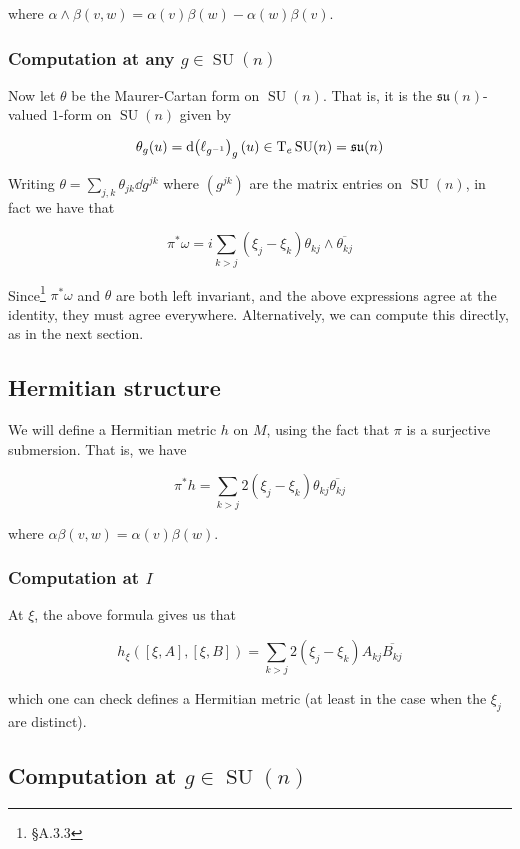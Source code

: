 \documentclass{article}
\DeclareMathOperator{\SU}{SU}
\newcommand{\su}{\mathfrak{su}}
\begin{document}
where \(\alpha \wedge \beta(v, w) = \alpha(v)\beta(w) - \alpha(w)\beta(v)\).

\subsubsection{Computation at any \(g \in \SU(n)\)}

Now let \(\theta\) be the Maurer-Cartan form on \(\SU(n)\). That is, it is the \(\su(n)\)-valued \(1\)-form on \(\SU(n)\) given by

\[\theta_g(u) = \dd (\ell_{g^{-1}})_g(u) \in \TT_e\SU(n) = \su(n)\]

Writing \(\theta = \sum_{j, k}\theta_{jk}\dd g^{jk}\) where \((g^{jk})\) are the matrix entries on \(\SU(n)\), in fact we have that

\[\pi^*\omega = i \sum_{k > j}(\xi_j - \xi_k)\theta_{kj}\wedge \overline{\theta_{kj}}\]

Since\footnote{\S A.3.3} \(\pi^*\omega\) and \(\theta\) are both left invariant, and the above expressions agree at the identity, they must agree everywhere. Alternatively, we can compute this directly, as in the next section.

\subsection{Hermitian structure}

We will define a Hermitian metric \(h\) on \( M\), using the fact that \(\pi\) is a surjective submersion. That is, we have

\[\pi^*h = \sum_{k > j}2(\xi_j - \xi_k)\theta_{kj}\overline{\theta_{kj}}\]

where \(\alpha\beta(v, w) = \alpha(v)\beta(w)\).

\subsubsection{Computation at \(I\)}

At \(\xi\), the above formula gives us that

\[h_\xi([\xi, A], [\xi, B]) = \sum_{k > j}2(\xi_j - \xi_k)A_{kj}\overline{B_{kj}}\]

which one can check defines a Hermitian metric (at least in the case when the \(\xi_j\) are distinct).

\subsection{Computation at \(g \in \SU(n)\)}
\end{document}

